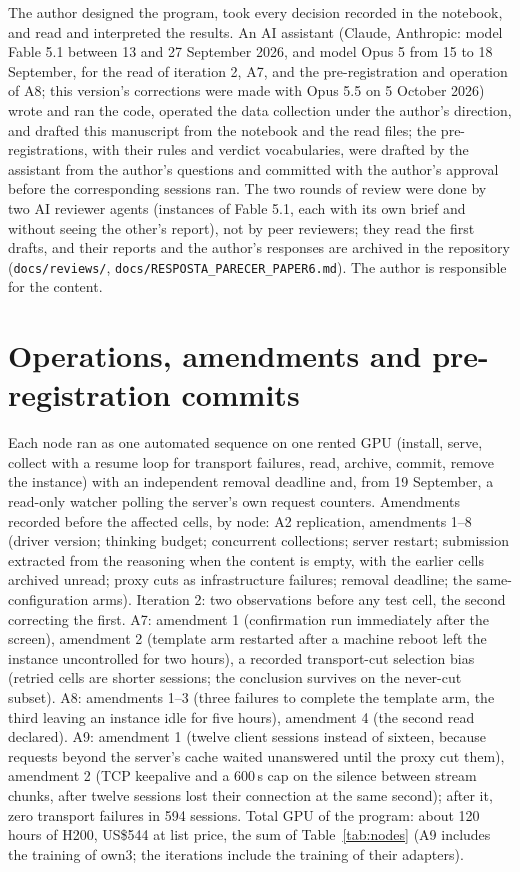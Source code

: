 \documentclass[11pt]{article}
\begin{document}
The author designed the program, took every decision recorded in the
notebook, and read and interpreted the results. An AI assistant (Claude,
Anthropic: model Fable 5.1 between 13 and 27 September 2026, and model Opus 5 from 15 to 18 September, for the read of iteration 2, A7, and the pre-registration and operation of A8; this version's corrections were made with Opus 5.5 on 5 October 2026) wrote and ran the code, operated the data collection under the author's direction, and drafted this manuscript from the notebook and the read files; the pre-registrations, with their rules and verdict vocabularies, were drafted by the assistant from the author's questions and committed with the author's approval before the corresponding sessions ran. The two rounds of review were done by two AI reviewer agents (instances of Fable 5.1, each with its own brief and without seeing the other's report), not by peer reviewers;
they read the first drafts, and their reports and the author's
responses are archived in the repository (\texttt{docs/reviews/},
\texttt{docs/RESPOSTA\_PARECER\_PAPER6.md}). The author is responsible for
the content.




\appendix

\section{Operations, amendments and pre-registration commits}
\label{app:ops}

Each node ran as one automated sequence on one rented GPU (install, serve,
collect with a resume loop for transport failures, read, archive, commit,
remove the instance) with an independent removal deadline and, from 19
September, a read-only watcher polling the server's own request counters.
Amendments recorded before the affected cells, by node: A2 replication,
amendments 1--8 (driver version; thinking budget; concurrent collections;
server restart; submission extracted from the reasoning when the content
is empty, with the earlier cells archived unread; proxy cuts as
infrastructure failures; removal deadline; the same-configuration arms).
Iteration 2: two observations before any test cell, the second correcting
the first. A7: amendment 1 (confirmation run immediately after the screen),
amendment 2 (template arm restarted after a machine reboot left the
instance uncontrolled for two hours), a recorded transport-cut selection
bias (retried cells are shorter sessions; the conclusion survives on the
never-cut subset). A8: amendments 1--3 (three failures to complete the
template arm, the third leaving an instance idle for five hours),
amendment 4 (the second read declared). A9: amendment 1 (twelve client
sessions instead of sixteen, because requests beyond the server's cache
waited unanswered until the proxy cut them), amendment 2 (TCP keepalive
and a 600\,s cap on the silence between stream chunks, after twelve
sessions lost their connection at the same second); after it, zero
transport failures in 594 sessions. Total GPU of the program: about 120
hours of H200, US\$544 at list price, the sum of Table~\ref{tab:nodes}
(A9 includes the training of own3; the iterations include the training of
their adapters).
\end{document}

